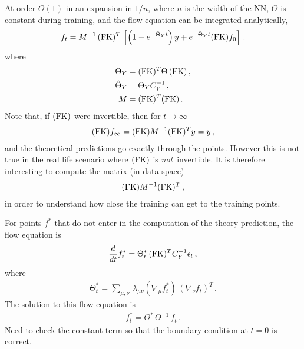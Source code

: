 \documentclass[11pt]{article}
\begin{document}
At order $O(1)$ in an expansion in $1/n$, where $n$ is the width of the NN, $\Theta$ is constant during training, and the flow equation can be integrated analytically, 
\begin{align}
    \label{eq:IntegrateFlowAtLeadingOrder}
    f_t = M^{-1}\, (\mathrm{FK})^T\, \left[
        \left(1 - e^{-\hat{\Theta}_Yt}\right) y +
        e^{-\hat{\Theta}_Y t} (\mathrm{FK}) f_0
    \right]\, .
\end{align}
where 
\begin{align}
    \label{eq:DefineThetaM}
    \Theta_Y &= (\mathrm{FK})^T \Theta\, (\mathrm{FK})\, , \\
    \hat{\Theta}_Y &= \Theta_Y C_Y^{-1}\, , \\    
    M &=  (\mathrm{FK})^T (\mathrm{FK})\, .
\end{align}
Note that, if $(\mathrm{FK})$ were invertible, then for $t\to\infty$
\begin{align}
    (\mathrm{FK}) f_\infty = (\mathrm{FK}) M^{-1} (\mathrm{FK})^T y = y\, ,
\end{align}
and the theoretical predictions go exactly through the points. However this is not true in the real life scenario where $(\mathrm{FK})$ is {\em not}\ invertible. It is therefore interesting to compute the matrix (in data space)
\begin{align}
    (\mathrm{FK}) M^{-1} (\mathrm{FK})^T \, ,    
\end{align}
in order to understand how close the training can get to the training points. 

For points $f^*$ that do not enter in the computation of the theory prediction, the flow 
equation is
\begin{align}
    \label{eq:FlowStarLinearDataNTK}
    \frac{d}{dt} f^*_t = 
        \Theta^*_t\, (\mathrm{FK})^T C_Y^{-1} \epsilon_t\, ,
\end{align}
where 
\begin{align}
    \label{eq:NTKStarDef}
    \Theta^*_t = \sum_{\mu,\nu}\, \lambda_{\mu\nu} \left(\nabla_\mu f^*_t\right)\, 
    \left(\nabla_\nu f_t\right)^T\, .
\end{align}
The solution to this flow equation is
\begin{align}
    \label{eq:IntegrateFlowAtLeadingOrderStar}
    f^*_t = \Theta^*\, \Theta^{-1}\, f_t \, . 
\end{align}
Need to check the constant term so that the boundary condition at $t=0$ is correct. 





\appendix


\end{document}
